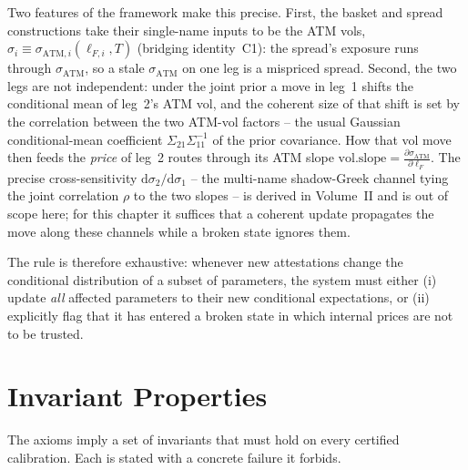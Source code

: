 \documentclass[11pt]{book}
\theoremstyle{plain}
\theoremstyle{definition}
\theoremstyle{remark}
\newcommand{\lF}{\ell_F}                         %
\newcommand{\satm}{\sigma_{\mathrm{ATM}}}        %
\newcommand{\satmi}[1]{\sigma_{\mathrm{ATM},#1}} %
\newcommand{\lFi}[1]{\ell_{F,#1}}                %
\newcommand{\volslope}{\mathrm{vol.slope}}       %
\newcommand{\dd}{\mathrm{d}}                                  %
\newcommand{\pd}[2]{\frac{\partial #1}{\partial #2}}          %
\begin{document}
Two features of the framework make this precise. First, the basket and spread
constructions take their single-name inputs to be the ATM vols,
$\sigma_i\equiv\satmi{i}(\lFi{i},T)$ (bridging identity~C1): the spread's exposure
runs through $\satm$, so a stale $\satm$ on one leg is a mispriced spread. Second,
the two legs are not independent: under the joint prior a move in leg~1 shifts the
conditional mean of leg~2's ATM vol, and the coherent size of that shift is set by
the correlation between the two ATM-vol factors -- the usual Gaussian
conditional-mean coefficient $\Sigma_{21}\Sigma_{11}^{-1}$ of the prior
covariance. How that vol move then feeds the \emph{price} of leg~2 routes through
its ATM slope $\volslope=\pd{\satm}{\lF}$. The precise cross-sensitivity
$\dd\sigma_2/\dd\sigma_1$ -- the multi-name shadow-Greek channel tying the joint
correlation $\rho$ to the two slopes -- is derived in Volume~II and is out of scope
here; for this chapter it suffices that a coherent update propagates the move
along these channels while a broken state ignores them.

The rule is therefore exhaustive: whenever new attestations change the conditional
distribution of a subset of parameters, the system must either (i) update
\emph{all} affected parameters to their new conditional expectations, or (ii)
explicitly flag that it has entered a broken state in which internal prices are
not to be trusted.

\section{Invariant Properties}

The axioms imply a set of invariants that must hold on every certified
calibration. Each is stated with a concrete failure it forbids.
\end{document}
